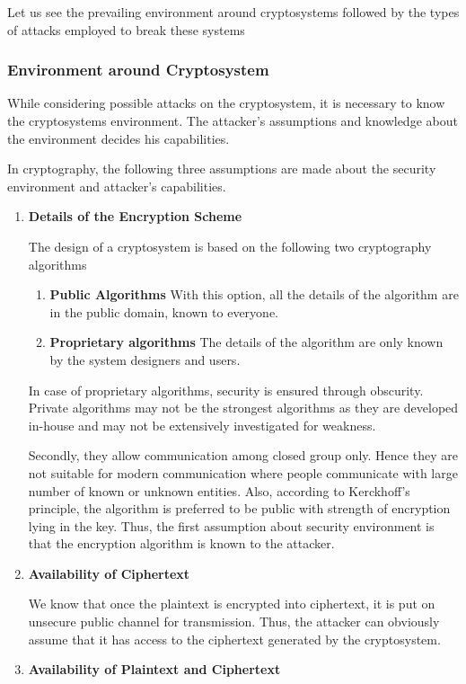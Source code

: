 \documentclass[british]{article}
\begin{document}
Let us see the prevailing environment around cryptosystems followed
by the types of attacks employed to break these systems \textminus{}

\subsubsection{Environment around Cryptosystem}

While considering possible attacks on the cryptosystem, it is necessary
to know the cryptosystems environment. The attacker's assumptions
and knowledge about the environment decides his capabilities.

In cryptography, the following three assumptions are made about the
security environment and attacker's capabilities. 
\begin{enumerate}
\item \textbf{Details of the Encryption Scheme}

The design of a cryptosystem is based on the following two cryptography
algorithms \textminus{} 
\begin{enumerate}
\item \textbf{Public Algorithms \textminus{}} With this option, all the
details of the algorithm are in the public domain, known to everyone. 
\item \textbf{Proprietary algorithms \textminus{} }The details of the algorithm
are only known by the system designers and users. 
\end{enumerate}
In case of proprietary algorithms, security is ensured through obscurity.
Private algorithms may not be the strongest algorithms as they are
developed in-house and may not be extensively investigated for weakness.

\noindent Secondly, they allow communication among closed group only.
Hence they are not suitable for modern communication where people
communicate with large number of known or unknown entities. Also,
according to Kerckhoff's principle, the algorithm is preferred to
be public with strength of encryption lying in the key. Thus, the
first assumption about security environment is that the encryption
algorithm is known to the attacker. 
\item \textbf{Availability of Ciphertext}

We know that once the plaintext is encrypted into ciphertext, it is
put on unsecure public channel for transmission. Thus, the attacker
can obviously assume that it has access to the ciphertext generated
by the cryptosystem. 
\item \textbf{Availability of Plaintext and Ciphertext}


\end{enumerate}
\end{document}
